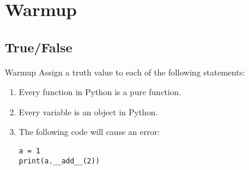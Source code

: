 \documentclass[9pt]{beamer}
\title{\themidterm}
\author{\theauthors}
\institute{\theorganization}
\date{\thedate}
\begin{document}

\begin{frame}
  \titlepage
\end{frame}

\section{Warmup}
\subsection{True/False}
\begin{frame}[fragile]{Warmup}
  Assign a truth value to each of the following statements:
  \begin{enumerate}
    \item
      Every function in Python is a pure function.

    \item
      Every variable is an object in Python.

    \item
      The following code will cause an error:

      \begin{lstlisting}
a = 1
print(a.__add__(2))
      \end{lstlisting}

  \end{enumerate}
\end{frame}
\end{document}
